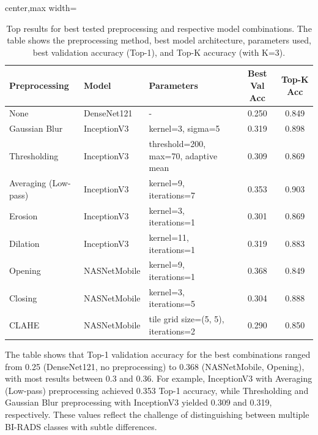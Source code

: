 \documentclass[12pt]{article}
\begin{document}
\begin{table}[H]
    \centering
    \small
    \begin{adjustbox}{center,max width=\textwidth}
        \begin{tabular}{|l|l|l|c|c|}
            \hline
            \textbf{Preprocessing} & \textbf{Model} & \textbf{Parameters}                  & \textbf{Best Val Acc} & \textbf{Top-K Acc} \\
            \hline
            None                   & DenseNet121    & -                                    & 0.250                 & 0.849              \\
            Gaussian Blur          & InceptionV3    & kernel=3, sigma=5                    & 0.319                 & 0.898              \\
            Thresholding           & InceptionV3    & threshold=200, max=70, adaptive mean & 0.309                 & 0.869              \\
            Averaging (Low-pass)   & InceptionV3    & kernel=9, iterations=7               & 0.353                 & 0.903              \\
            Erosion                & InceptionV3    & kernel=3, iterations=1               & 0.301                 & 0.869              \\
            Dilation               & InceptionV3    & kernel=11, iterations=1              & 0.319                 & 0.883              \\
            Opening                & NASNetMobile   & kernel=9, iterations=1               & 0.368                 & 0.849              \\
            Closing                & NASNetMobile   & kernel=3, iterations=5               & 0.304                 & 0.888              \\
            CLAHE                  & NASNetMobile   & tile grid size=(5, 5), iterations=2  & 0.290                 & 0.850              \\
            \hline
        \end{tabular}
    \end{adjustbox}
    \caption{Top results for best tested preprocessing and respective model combinations. The table shows the preprocessing method, best model architecture, parameters used, best validation accuracy (Top-1), and Top-K accuracy (with K=3).}
    \label{tab:final_results}
\end{table}

The table shows that Top-1 validation accuracy for the best combinations ranged from 0.25 (DenseNet121, no preprocessing) to 0.368 (NASNetMobile, Opening), with most results between 0.3 and 0.36. For example, InceptionV3 with Averaging (Low-pass) preprocessing achieved 0.353 Top-1 accuracy, while Thresholding and Gaussian Blur preprocessing with InceptionV3 yielded 0.309 and 0.319, respectively. These values reflect the challenge of distinguishing between multiple BI-RADS classes with subtle differences.
\end{document}
